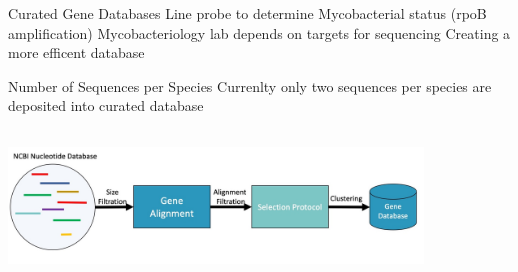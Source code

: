 \documentclass[11pt, xcolor=table]{beamer}
\begin{document}
  \begin{frame}{Curated Gene Databases}
  Line probe to determine Mycobacterial status (rpoB amplification)
  Mycobacteriology lab depends on targets for sequencing
  Creating a more efficent database
  \begin{block}{Number of Sequences per Species}
  Currenlty only two sequences per species are deposited into curated database
  \end{block}
  \center
  \includegraphics[height=4cm, width=11cm]{CPBS_11_18/Gene_Database_Workflow.jpg}
  \end{frame}
\end{document}
